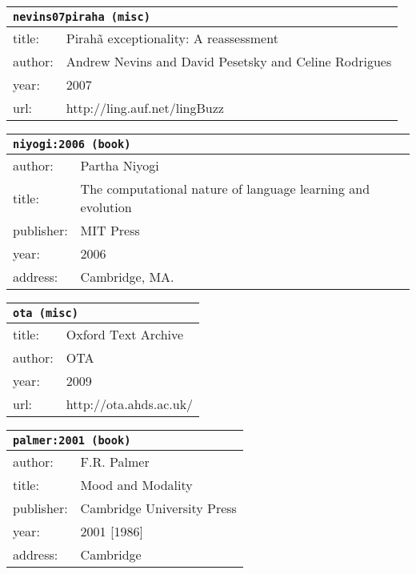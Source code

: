 \documentclass{article}
\begin{document}
\bigskip

\begin{tabular}{p{}p{}}
\multicolumn{2}{l}{\texttt{nevins07piraha (misc)}}\\
\hline
title: & Pirah{\~a} exceptionality: A reassessment\\
author: & Andrew Nevins and David Pesetsky and Celine Rodrigues\\
year: & 2007\\
url: & http://ling.auf.net/lingBuzz\\
\end{tabular}

\bigskip

\begin{tabular}{p{}p{}}
\multicolumn{2}{l}{\texttt{niyogi:2006 (book)}}\\
\hline
author: & Partha Niyogi\\
title: & The computational nature of language learning and evolution\\
publisher: & MIT Press\\
year: & 2006\\
address: & Cambridge, MA.\\
\end{tabular}

\bigskip

\begin{tabular}{p{}p{}}
\multicolumn{2}{l}{\texttt{ota (misc)}}\\
\hline
title: & Oxford \textsc{T}ext \textsc{A}rchive\\
author: & OTA\\
year: & 2009\\
url: & http://ota.ahds.ac.uk/\\
\end{tabular}

\bigskip

\begin{tabular}{p{}p{}}
\multicolumn{2}{l}{\texttt{palmer:2001 (book)}}\\
\hline
author: & F.R. Palmer\\
title: & Mood and Modality\\
publisher: & Cambridge University Press\\
year: & 2001 [1986]\\
address: & Cambridge\\
\end{tabular}
\end{document}

